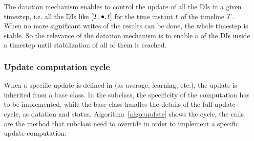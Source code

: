 The datation mechanism enables to control the update of all the DIs in a given timestep, i.e. all the DIs like ${\left[T,\bullet,t\right]}$ for the time instant $t$ of the timeline $T$. When no more significant writes of the results can be done, the whole timestep is stable. So the relevance of the datation mechanism is to enable a  of the DIs inside a timestep until stabilization of all of them is reached.

\subsubsection{Update computation cycle}

When a specific update is defined in \CxSOM (as average, learning, etc.), the update is inherited from a base  class. In the subclass, the specificity of the computation has to be implemented, while the base class handles the details of the full update cycle, as datation and status. Algorithm~\ref{algo:update} shows the cycle, the  calls are the method that subclass need to override in order to implement a specific update computation.


